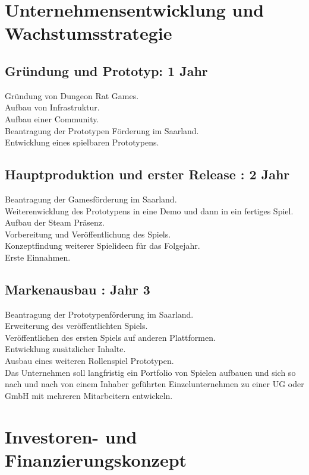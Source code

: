 \documentclass[envcountsame,envcountchap deutsch]{i-studis}
\begin{document}
\chapter{Unternehmensentwicklung und Wachstumsstrategie}
\section{Gründung und Prototyp: 1 Jahr}
Gründung von Dungeon Rat Games.\\
Aufbau von Infrastruktur.\\
Aufbau einer Community.\\
Beantragung der Prototypen Förderung im Saarland.\\
Entwicklung eines spielbaren Prototypens.\\
\section{Hauptproduktion und erster Release : 2 Jahr}
Beantragung der Gamesförderung im Saarland.\\
Weiterenwicklung des Prototypens in eine Demo und dann in ein fertiges Spiel.\\
Aufbau der Steam Präsenz.\\
Vorbereitung und Veröffentlichung des Spiels.\\
Konzeptfindung weiterer Spielideen für das Folgejahr.\\
Erste Einnahmen.\\
\section{Markenausbau : Jahr 3}
Beantragung der Prototypenförderung im Saarland.\\
Erweiterung des veröffentlichten Spiels.\\
Veröffentlichen des ersten Spiels auf anderen Plattformen.\\
Entwicklung zusätzlicher Inhalte.\\
Ausbau eines weiteren Rollenspiel Prototypen.\\

Das Unternehmen soll langfristig ein Portfolio von Spielen aufbauen und sich so nach und nach von einem Inhaber geführten Einzelunternehmen zu einer UG oder GmbH mit mehreren Mitarbeitern entwickeln.

\chapter{ Investoren- und Finanzierungskonzept}
\end{document}
